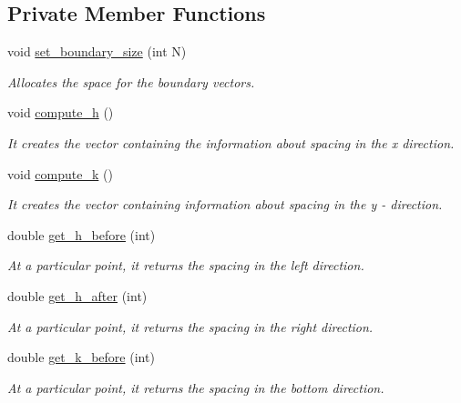 \subsection*{Private Member Functions}
\begin{DoxyCompactItemize}
\item 
void \hyperlink{class_compute_matrix_af7bd3f9c853300923172a5385e4902a7}{set\+\_\+boundary\+\_\+size} (int N)
\begin{DoxyCompactList}\small\item\em Allocates the space for the boundary vectors. \end{DoxyCompactList}\item 
void \hyperlink{class_compute_matrix_abecc229bc9d68c7106ffc8c23cece474}{compute\+\_\+h} ()
\begin{DoxyCompactList}\small\item\em It creates the vector containing the information about spacing in the x direction. \end{DoxyCompactList}\item 
void \hyperlink{class_compute_matrix_a60e30b3d8215425fb86880c72507c290}{compute\+\_\+k} ()
\begin{DoxyCompactList}\small\item\em It creates the vector containing information about spacing in the y -\/ direction. \end{DoxyCompactList}\item 
double \hyperlink{class_compute_matrix_a4017aead911acf0cf8507436049f1d8e}{get\+\_\+h\+\_\+before} (int)
\begin{DoxyCompactList}\small\item\em At a particular point, it returns the spacing in the left direction. \end{DoxyCompactList}\item 
double \hyperlink{class_compute_matrix_a71153b108b46b7863ff9ee93733991ce}{get\+\_\+h\+\_\+after} (int)
\begin{DoxyCompactList}\small\item\em At a particular point, it returns the spacing in the right direction. \end{DoxyCompactList}\item 
double \hyperlink{class_compute_matrix_a505ffbdcec8dc113d9594549a411814e}{get\+\_\+k\+\_\+before} (int)
\begin{DoxyCompactList}\small\item\em At a particular point, it returns the spacing in the bottom direction. \end{DoxyCompactList}\item 

\end{DoxyCompactItemize}

